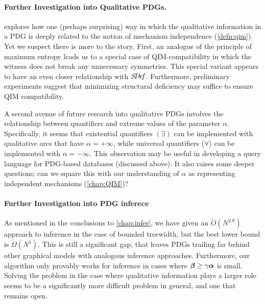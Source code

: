 \paragraph{Further Investigation into Qualitative PDGs.}
 explores how one (perhaps surprising) way in which the qualitative information in a PDG is deeply related to the notion of mechanism independence (\cref{defn:qim}).
Yet we suspect there is more to the story. 
First, an analogue of the principle of maximum entropy 
    leads us to a special case of QIM-compatibility in which the witness does not break any unnecessary symmetries.
This special variant appears to have an even closer relationship with $\mathit{S\mskip-3.5muD\mskip-2.5mue\mskip-1.5muf}$.
Furthermore, preliminary experiments suggest that minimizing structural deficiency may suffice to ensure QIM compatibility. 

A second avenue of future research into qualitative PDGs involves the relationship between quantifiers and extreme values of the parameter $\alpha$. 
Specifically, it seems that existential quantifiers $(\exists)$ can be implemented with qualitative arcs that have $\alpha = +\infty$, while universal quantifiers ($\forall$) can be implemented with $\alpha = -\infty$. 
This observation may be useful in developing a query language for PDG-based databases (discussed above).
It also raises some deeper questions;
can we square this with our understanding of $\alpha$ as representing independent mechanisms (\cref{chap:QIM})?


\paragraph{Further Investigation into PDG inferece}
As mentioned in the conclusions to \cref{chap:infer}, we have given an $\tilde O(N^{2.9})$ approach to inference in the case of bounded treewidth, but the best lower bound is $\tilde \Omega( N^1)$. 
This is still a significant gap, that leaves PDGs trailing far behind other graphical models with analogous inference approaches.
Furthermore, our algorithm only provably works for inference in cases where $\boldsymbol\beta \ge \gamma\boldsymbol\alpha$ is small.
Solving the problem in the case where qualitative information plays a larger role seems to be a significantly more difficult problem in general, and one that remains open. 


